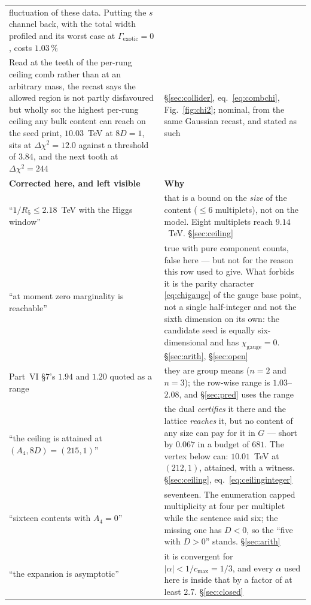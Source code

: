 \documentclass[11pt,a4paper]{article}
\begin{document}
\begin{longtable}{p{}p{}}
fluctuation of these data. Putting the $s$ channel back, with the total width profiled and its
worst case at $\Gamma_{\mathrm{exotic}}=0$, costs $1.03\,\%$\\
Read at the teeth of the per-rung ceiling comb rather than at an arbitrary mass, the recast says the
allowed region is not partly disfavoured but wholly so: the highest per-rung ceiling any bulk
content can reach on the seed \cite{KM25} print, $10.03$~TeV at $8D=1$, sits at $\Delta\chi^2=12.0$ against a threshold of
$3.84$, and the next tooth at $\Delta\chi^2=244$ & \S\ref{sec:collider}, eq.~\eqref{eq:combchi},
Fig.~\ref{fig:chi2}; nominal, from the same Gaussian recast, and stated as such\\
\midrule
\rowcolor{hdrblue!10}\textbf{Corrected here, and left visible} & \textbf{Why}\\
\midrule
``$1/R_5\le2.18$~TeV with the Higgs window'' & that is a bound on the \emph{size} of the content
($\le6$ multiplets), not on the model. Eight multiplets reach $9.14$~TeV. \S\ref{sec:ceiling}\\
``at moment zero marginality is reachable'' & true with pure component counts, false here --- but
not for the reason this row used to give. What forbids it is the parity character
\eqref{eq:chigauge} of the gauge base point, not a single half-integer and not the sixth dimension
on its own: the candidate seed is equally six-dimensional and has $\chi_{\mathrm{gauge}}=0$.
\S\ref{sec:arith}, \S\ref{sec:open}\\
Part~VI \S7's $1.94$ and $1.20$ quoted as a range & they are group means ($n=2$ and $n=3$); the
row-wise range is $1.03$--$2.08$, and \S\ref{sec:pred} uses the range\\
``the ceiling is attained at $(A_4,8D)=(215,1)$'' & the dual \emph{certifies} it there and the
lattice \emph{reaches} it, but no content of any size can pay for it in $G$ --- short by $0.067$ in
a budget of $681$. The vertex below can: $10.01$~TeV at $(212,1)$, attained, with a witness.
\S\ref{sec:ceiling}, eq.~\eqref{eq:ceilinginteger}\\
``sixteen contents with $A_4=0$'' & seventeen. The enumeration capped multiplicity at four per
multiplet while the sentence said six; the missing one has $D<0$, so the ``five with $D>0$'' stands.
\S\ref{sec:arith}\\
``the expansion is asymptotic'' & it is convergent for $|\alpha|<1/c_{\max}=1/3$, and every
$\alpha$ used here is inside that by a factor of at least $2.7$. \S\ref{sec:closed}\\

\end{longtable}
\end{document}
